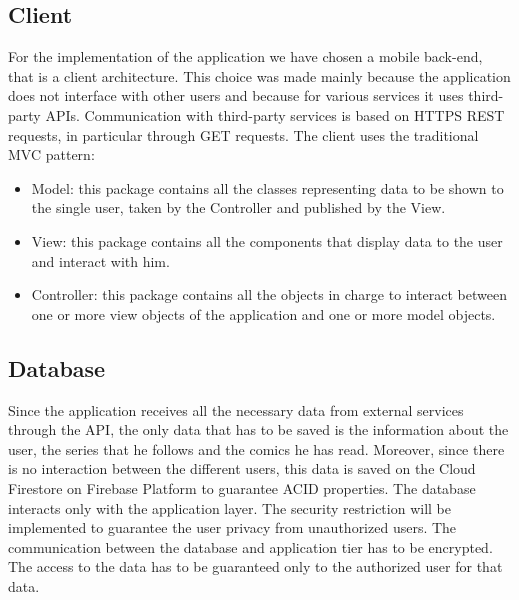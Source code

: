 \clearpage

\subsection{Client}
For the implementation of the application we have chosen a mobile back-end, that is a client architecture. This choice was made mainly because the application does not interface with other users and because for various services it uses third-party APIs. Communication with third-party services is based on HTTPS REST requests, in particular through GET requests.
The client uses the traditional MVC pattern:
\begin{itemize}
\item Model: this package contains all the classes representing data to be shown to the single user, taken by the Controller and published by the View.
\item View: this package contains all the components that display data to the user and interact with him.
\item Controller: this package contains all the objects in charge to interact between one or more view objects of the application and one or more model objects.
\end{itemize}

\subsection{Database}
Since the application receives all the necessary data from external services through the API, the only data that has to be saved is the information about the user, the series that he follows and the comics he has read. Moreover, since there is no interaction between the different users, this data is saved on the Cloud Firestore on Firebase Platform to guarantee ACID properties. The database interacts only with the application layer. The security restriction will be implemented to guarantee the user privacy from unauthorized users. The communication between the database and application tier has to be encrypted. The access to the data has to be guaranteed only to the authorized user for that data.

